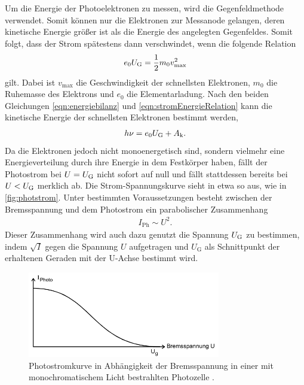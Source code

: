 \noindent
Um die Energie der Photoelektronen zu messen, wird die Gegenfeldmethode verwendet. Somit können nur die Elektronen zur Messanode gelangen, deren kinetische Energie
größer ist als die Energie des angelegten Gegenfeldes. Somit folgt, dass der Strom spätestens dann verschwindet, wenn die folgende Relation 
\begin{align}
    e_0 U_{\text G}=\frac 12 m_0v_{\text{max}}^2
    \label{eqn:stromEnergieRelation}
\end{align}
gilt. Dabei ist $v_{\text{max}}$ die Geschwindigkeit der schnellsten Elektronen, $m_0$ die Ruhemasse des Elektrons und $e_0$ die Elementarladung. Nach den beiden
Gleichungen \eqref{eqn:energiebilanz} und \eqref{eqn:stromEnergieRelation} kann die kinetische Energie der schnellsten Elektronen bestimmt werden,
\begin{align}
    h\nu = e_0 U_{\text G} + A_{\text k}.
    \label{eqn:energieElektr}
\end{align}
Da die Elektronen jedoch nicht monoenergetisch sind, sondern vielmehr eine Energieverteilung durch ihre Energie in dem Festkörper haben, fällt der Photostrom bei $U=U_{\text G}$ nicht sofort auf null und fällt
stattdessen bereits bei $U<U_{\text G}$ merklich ab. Die Strom-Spannungskurve sieht in etwa so aus, wie in \autoref{fig:photstrom}. Unter bestimmten Voraussetzungen besteht zwischen der Bremsspannung
und dem Photostrom ein parabolischer Zusammenhang
\begin{align}
    I_{\text{Ph}} \sim U^2.
    \label{eqn:wurzelIGesetz}
\end{align}
Dieser Zusammenhang wird auch dazu genutzt die Spannung $U_{\text G}$ zu bestimmen, indem $\sqrt I$ gegen die Spannung $U$ aufgetragen und $U_{\text{G}}$ 
als Schnittpunkt der erhaltenen Geraden mit der U-Achse bestimmt wird.
\begin{figure}[H]
    \centering
    \includegraphics[width = 0.75\textwidth]{data/Photostrom.png}
    \caption{Photostromkurve in Abhängigkeit der Bremsspannung in einer mit monochromatischem Licht bestrahlten Photozelle \cite{Anleitung500}.}
    \label{fig:photstrom}
\end{figure}